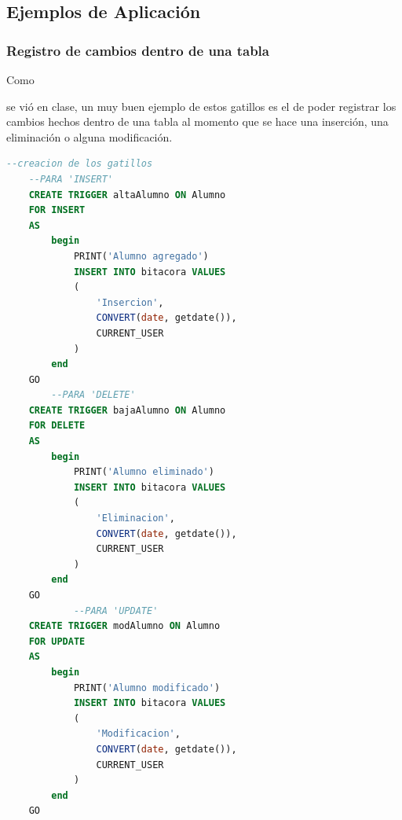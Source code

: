 \documentclass[stu, 12pt, letterpaper, donotrepeattitle, floatsintext, natbib]{apa7}
\begin{document}
    \subsection*{Ejemplos de Aplicación}
    \subsubsection*{Registro de cambios dentro de una tabla}
    Como \begin{justifying}
      se vió en clase, un muy buen ejemplo de estos gatillos es el de poder registrar
    los cambios hechos dentro de una tabla al momento que se hace una inserción, una eliminación o alguna modificación.\par
    \end{justifying}
    \vspace{\baselineskip}
    \begin{lstlisting}[language=SQL]
      --creacion de los gatillos
    --PARA 'INSERT'
    CREATE TRIGGER altaAlumno ON Alumno
    FOR INSERT
    AS
        begin
            PRINT('Alumno agregado')
            INSERT INTO bitacora VALUES
            (
                'Insercion',
                CONVERT(date, getdate()),
                CURRENT_USER
            )
        end
    GO
        --PARA 'DELETE'
    CREATE TRIGGER bajaAlumno ON Alumno
    FOR DELETE
    AS
        begin
            PRINT('Alumno eliminado')
            INSERT INTO bitacora VALUES
            (
                'Eliminacion',
                CONVERT(date, getdate()),
                CURRENT_USER
            )
        end
    GO
            --PARA 'UPDATE'
    CREATE TRIGGER modAlumno ON Alumno
    FOR UPDATE
    AS
        begin
            PRINT('Alumno modificado')
            INSERT INTO bitacora VALUES
            (
                'Modificacion',
                CONVERT(date, getdate()),
                CURRENT_USER
            )
        end
    GO\end{lstlisting}
\end{document}
